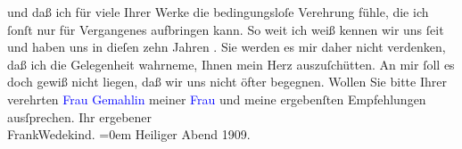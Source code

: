                und daß ich für viele Ihrer Werke die bedingungsloſe Verehrung fühle, die ich ſonſt
               nur für Vergangenes aufbringen kann. So weit ich weiß kennen wir uns ſeit \label{K_L01909_1v}\label{K_L01909_1h} und haben
               uns in dieſen zehn Jahren {\pb}\label{K_L01909_2v}\label{K_L01909_2h}. Sie werden es mir daher nicht
               verdenken, daß ich die Gelegenheit wahrneme, Ihnen mein Herz auszuſchütten. An mir
               ſoll es doch gewiß nicht liegen, daß wir uns nicht öfter begegnen.\pend
           \pstart
           Wollen Sie bitte Ihrer verehrten \textcolor{blue}{Frau
                  Gemahlin}{} meiner \textcolor{blue}{Frau}{} und
               meine ergebenſten Empfehlungen ausſprechen.\pend
           \pstart
           Ihr ergebener{\\[\baselineskip]}\spacefill\mbox{FrankWedekind.}\pend
           \leftskip=0em{}\pstart
           Heiliger Abend 1909.\pend
           \endnumbering{}  
      